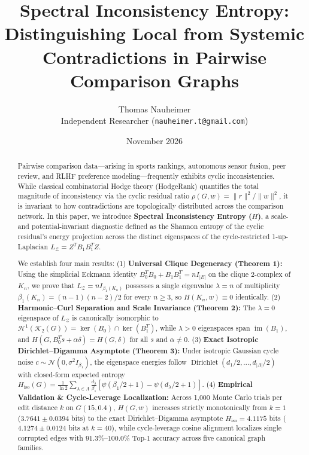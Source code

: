 \documentclass[11pt,a4paper]{article}
\title{\textbf{Spectral Inconsistency Entropy: Distinguishing Local from Systemic Contradictions in Pairwise Comparison Graphs}}
\author{Thomas Nauheimer\\
\small Independent Researcher (\texttt{nauheimer.t@gmail.com})}
\date{November 2026}
\begin{document}
\maketitle

\begin{abstract}
Pairwise comparison data---arising in sports rankings, autonomous sensor fusion, peer review, and RLHF preference modeling---frequently exhibits cyclic inconsistencies. While classical combinatorial Hodge theory (HodgeRank) quantifies the total magnitude of inconsistency via the cyclic residual ratio $\rho(G, w) = \|r\|^2 / \|w\|^2$, it is invariant to how contradictions are topologically distributed across the comparison network. In this paper, we introduce \textbf{Spectral Inconsistency Entropy ($H$)}, a scale- and potential-invariant diagnostic defined as the Shannon entropy of the cyclic residual's energy projection across the distinct eigenspaces of the cycle-restricted 1-up-Laplacian $L_{\mathcal{Z}} = Z^T B_1 B_1^T Z$.

We establish four main results: (1) \textbf{Universal Clique Degeneracy (Theorem 1):} Using the simplicial Eckmann identity $B_0^T B_0 + B_1 B_1^T = n I_{|E|}$ on the clique 2-complex of $K_n$, we prove that $L_{\mathcal{Z}} = n I_{\beta_1(K_n)}$ possesses a single eigenvalue $\lambda = n$ of multiplicity $\beta_1(K_n) = (n-1)(n-2)/2$ for every $n \ge 3$, so $H(K_n, w) \equiv 0$ identically. (2) \textbf{Harmonic--Curl Separation and Scale Invariance (Theorem 2):} The $\lambda=0$ eigenspace of $L_{\mathcal{Z}}$ is canonically isomorphic to $\mathcal{H}^1(\mathcal{K}_2(G)) = \ker(B_0) \cap \ker(B_1^T)$, while $\lambda > 0$ eigenspaces span $\operatorname{im}(B_1)$, and $H(G, B_0^T s + \alpha \delta) = H(G, \delta)$ for all $s$ and $\alpha \neq 0$. (3) \textbf{Exact Isotropic Dirichlet--Digamma Asymptote (Theorem 3):} Under isotropic Gaussian cycle noise $c \sim \mathcal{N}(0, \sigma^2 I_{\beta_1})$, the eigenspace energies follow $\operatorname{Dirichlet}(d_1/2, \dots, d_{|\Lambda|}/2)$ with closed-form expected entropy $H_{\mathrm{iso}}(G) = \frac{1}{\ln 2} \sum_{\lambda \in \Lambda} \frac{d_\lambda}{\beta_1} [\psi(\beta_1/2 + 1) - \psi(d_\lambda/2 + 1)]$. (4) \textbf{Empirical Validation \& Cycle-Leverage Localization:} Across 1,000 Monte Carlo trials per edit distance $k$ on $G(15, 0.4)$, $H(G, w)$ increases strictly monotonically from $k=1$ ($3.7641 \pm 0.0394$ bits) to the exact Dirichlet--Digamma asymptote $H_{\mathrm{iso}} = 4.1175$ bits ($4.1274 \pm 0.0124$ bits at $k=40$), while cycle-leverage cosine alignment localizes single corrupted edges with $91.3\%$--$100.0\%$ Top-1 accuracy across five canonical graph families.
\end{abstract}
\end{document}
